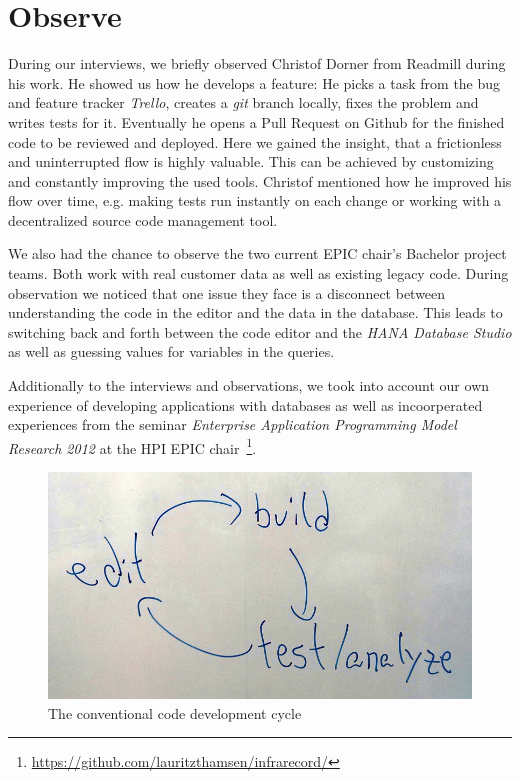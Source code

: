 \section[Observer (Author: Johan Uhle)]{Observe} 
\label{sec:OBSERVE}
During our interviews, we briefly observed Christof Dorner from Readmill during his work. He showed us how he develops a feature: He picks a task from the bug and feature tracker \emph{Trello}, creates a \emph{git} branch locally, fixes the problem and writes tests for it. Eventually he opens a Pull Request on Github for the finished code to be reviewed and deployed. Here we gained the insight, that a frictionless and uninterrupted flow is highly valuable. This can be achieved by customizing and constantly improving the used tools. Christof mentioned how he improved his flow over time, e.g. making tests run instantly on each change or working with a decentralized source code management tool.

We also had the chance to observe the two current EPIC chair's Bachelor project teams. Both work with real customer data as well as existing legacy code. During observation we noticed that one issue they face is a disconnect between understanding the code in the editor and the data in the database. This leads to switching back and forth between the code editor and the \emph{HANA Database Studio} as well as guessing values for variables in the queries.

Additionally to the interviews and observations, we took into account our own experience of developing applications with databases as well as incoorperated experiences from the seminar \emph{Enterprise Application Programming Model Research 2012} at the HPI EPIC chair~\footnote{\url{https://github.com/lauritzthamsen/infrarecord/}}.

\begin{figure}
    \includegraphics[width=\linewidth]{images/EditBuildTest.jpg}
    \caption{The conventional code development cycle}
    \label{fig:cycle}
\end{figure}

